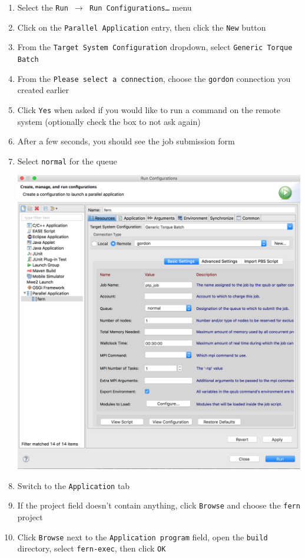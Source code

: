 \begin{enumerate}
  \item Select the \texttt{Run $\rightarrow$ Run Configurations\ldots} menu
  \item Click on the \texttt{Parallel Application} entry, then click the
  \texttt{New} button
  \item From the \texttt{Target System Configuration} dropdown, select
  \texttt{Generic Torque Batch}
  \item From the \texttt{Please select a connection}, choose the \texttt{gordon}
  connection you created earlier
  \item Click \texttt{Yes} when asked if you would like to run a command on the
  remote system (optionally check the box to not ask again)
  \item After a few seconds, you should see the job submission form
  \item Select \texttt{normal} for the queue
  
  \begin{center} \includegraphics[width=\textwidth]{figures/runConfiguration}
  \end{center}
  
  \item Switch to the \texttt{Application} tab
  \item If the project field doesn't contain anything, click \texttt{Browse} and
  choose the \texttt{fern} project
  \item Click \texttt{Browse} next to the \texttt{Application program} field,
  open the \texttt{build} directory, select \texttt{fern-exec}, then click
  \texttt{OK}
  

\end{enumerate}
